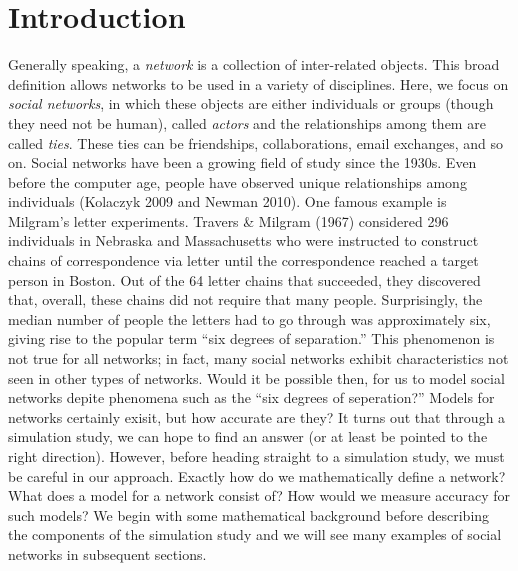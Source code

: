 \documentclass[12pt,twoside]{amherstthesis}
\begin{document}
  
  \mainmatter %
  \pagestyle{fancyplain} %

  \onehalfspacing
  
  \chapter*{Introduction}\label{introduction}
  
  Generally speaking, a \emph{network} is a collection of inter-related
  objects. This broad definition allows networks to be used in a variety
  of disciplines. Here, we focus on \emph{social networks}, in which these
  objects are either individuals or groups (though they need not be
  human), called \emph{actors} and the relationships among them are called
  \emph{ties}. These ties can be friendships, collaborations, email
  exchanges, and so on. Social networks have been a growing field of study
  since the 1930s. Even before the computer age, people have observed
  unique relationships among individuals (Kolaczyk 2009 and Newman 2010).
  One famous example is Milgram's letter experiments. Travers \& Milgram
  (1967) considered 296 individuals in Nebraska and Massachusetts who were
  instructed to construct chains of correspondence via letter until the
  correspondence reached a target person in Boston. Out of the 64 letter
  chains that succeeded, they discovered that, overall, these chains did
  not require that many people. Surprisingly, the median number of people
  the letters had to go through was approximately six, giving rise to the
  popular term ``six degrees of separation.'' This phenomenon is not true
  for all networks; in fact, many social networks exhibit characteristics
  not seen in other types of networks. Would it be possible then, for us
  to model social networks depite phenomena such as the ``six degrees of
  seperation?'' Models for networks certainly exisit, but how accurate are
  they? It turns out that through a simulation study, we can hope to find
  an answer (or at least be pointed to the right direction). However,
  before heading straight to a simulation study, we must be careful in our
  approach. Exactly how do we mathematically define a network? What does a
  model for a network consist of? How would we measure accuracy for such
  models? We begin with some mathematical background before describing the
  components of the simulation study and we will see many examples of
  social networks in subsequent sections.
  
\end{document}
